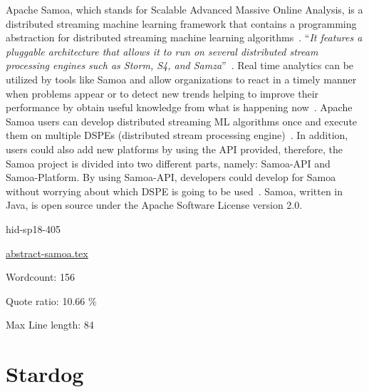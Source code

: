 Apache Samoa, which stands for Scalable Advanced Massive Online
Analysis, is a distributed streaming machine learning framework that
contains a programming abstraction for distributed streaming machine
learning algorithms~\cite{hid-sp18-405-www-samoa}. \color{blue}``\emph{It features a
pluggable architecture that allows it to run on several distributed
stream processing engines such as Storm, S4, and
Samza}''\color{black}~\cite{hid-sp18-405-www-samoa}. Real time analytics can be
utilized by tools like Samoa and allow organizations to react in a
timely manner when problems appear or to detect new trends helping to
improve their performance by obtain useful knowledge from what is
happening now~\cite{hid-sp18-405-bif2015mining-samoa}. Apache Samoa
users can develop distributed streaming ML algorithms once and execute
them on multiple DSPEs (distributed stream processing
engine)~\cite{hid-sp18-405-mor2015samoa-samoa}. In addition, users
could also add new platforms by using the API provided, therefore, the
Samoa project is divided into two different parts, namely: Samoa-API and 
Samoa-Platform. By using Samoa-API, developers could develop for Samoa 
without worrying about which DSPE is going to be 
used~\cite{hid-sp18-405-blog-samoa}. Samoa, written in Java, is open 
source under the Apache Software License version 2.0.



\begin{IU}

hid-sp18-405

\href{https://github.com/cloudmesh-community/hid-sp18-405/blob/master//technology/abstract-samoa.tex}{abstract-samoa.tex}

 

Wordcount: 156


Quote ratio: 10.66 \%
 
Max Line length: 84
\end{IU}

\section{Stardog}

